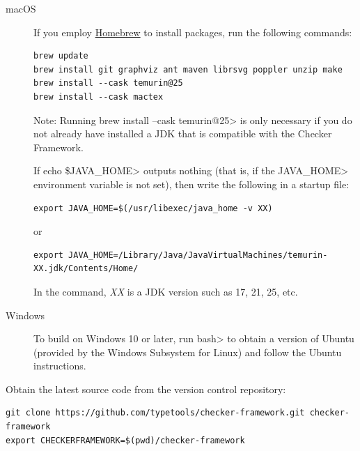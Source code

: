 \begin{description}
\item[macOS]
\label{building-prerequisites-macos}
  If you employ \href{https://brew.sh}{Homebrew} to install packages, run
  the following commands:

\begin{Verbatim}
brew update
brew install git graphviz ant maven librsvg poppler unzip make
brew install --cask temurin@25
brew install --cask mactex
\end{Verbatim}

Note: Running \<brew install --cask temurin@25> is only necessary if you do not
already have installed a JDK that is compatible with the Checker Framework.

If \<echo \$JAVA\_HOME> outputs nothing (that is, if the \<JAVA\_HOME>
environment variable is not set), then write the following
in a startup file:

\begin{Verbatim}
export JAVA_HOME=$(/usr/libexec/java_home -v XX)
\end{Verbatim}
or
\begin{Verbatim}
export JAVA_HOME=/Library/Java/JavaVirtualMachines/temurin-XX.jdk/Contents/Home/
\end{Verbatim}

In the command, \emph{XX} is a JDK version such as 17, 21, 25, etc.

\item[Windows]
  To build on Windows 10 or later,
  run \<bash> to obtain a version of
  Ubuntu (provided by the Windows Subsystem for Linux) and follow the Ubuntu
  instructions.


\end{description}



Obtain the latest source code from the version control repository:

\begin{Verbatim}
git clone https://github.com/typetools/checker-framework.git checker-framework
export CHECKERFRAMEWORK=$(pwd)/checker-framework
\end{Verbatim}

